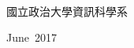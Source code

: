 \begin{acknowledgementsCH}

\setlength{\baselineskip}{1.5em}
\\
\\
\\

\raggedright{國立政治大學資訊科學系}

\raggedright{June\ 2017}

\end{acknowledgementsCH}

